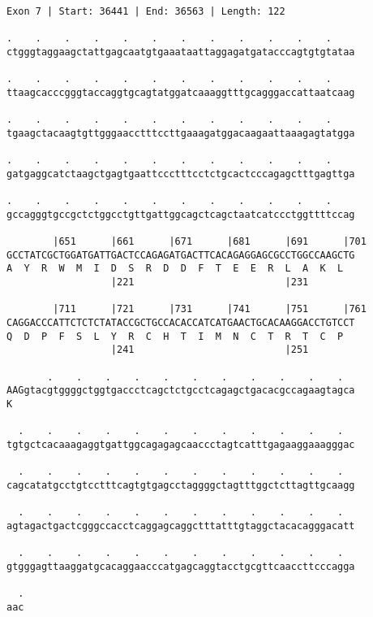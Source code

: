 \documentclass{article}
\begin{document}
\begin{Verbatim}
Exon 7 | Start: 36441 | End: 36563 | Length: 122
 
.    .    .    .    .    .    .    .    .    .    .    .    
ctgggtaggaagctattgagcaatgtgaaataattaggagatgatacccagtgtgtataa
  
.    .    .    .    .    .    .    .    .    .    .    .    
ttaagcacccgggtaccaggtgcagtatggatcaaaggtttgcagggaccattaatcaag
  
.    .    .    .    .    .    .    .    .    .    .    .    
tgaagctacaagtgttgggaacctttccttgaaagatggacaagaattaaagagtatgga
  
.    .    .    .    .    .    .    .    .    .    .    .    
gatgaggcatctaagctgagtgaattccctttcctctgcactcccagagctttgagttga
  
.    .    .    .    .    .    .    .    .    .    .    .    
gccagggtgccgctctggcctgttgattggcagctcagctaatcatccctggttttccag
  
        |651      |661      |671      |681      |691      |701
GCCTATCGCTGGATGATTGACTCCAGAGATGACTTCACAGAGGAGCGCCTGGCCAAGCTG
A  Y  R  W  M  I  D  S  R  D  D  F  T  E  E  R  L  A  K  L  
                  |221                          |231        
  
        |711      |721      |731      |741      |751      |761
CAGGACCCATTCTCTCTATACCGCTGCCACACCATCATGAACTGCACAAGGACCTGTCCT
Q  D  P  F  S  L  Y  R  C  H  T  I  M  N  C  T  R  T  C  P  
                  |241                          |251        
  
       .    .    .    .    .    .    .    .    .    .    .  
AAGgtacgtggggctggtgaccctcagctctgcctcagagctgacacgccagaagtagca
K                                                           
  
  .    .    .    .    .    .    .    .    .    .    .    .  
tgtgctcacaaagaggtgattggcagagagcaaccctagtcatttgagaaggaaagggac
  
  .    .    .    .    .    .    .    .    .    .    .    .  
cagcatatgcctgtcctttcagtgtgagcctaggggctagtttggctcttagttgcaagg
  
  .    .    .    .    .    .    .    .    .    .    .    .  
agtagactgactcgggccacctcaggagcaggctttatttgtaggctacacagggacatt
  
  .    .    .    .    .    .    .    .    .    .    .    .  
gtgggagttaaggatgcacaggaacccatgagcaggtacctgcgttcaaccttcccagga
  
  .
aac
\end{Verbatim}
\newpage
\end{document}
